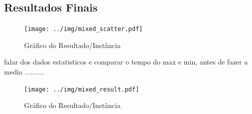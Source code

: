 \documentclass[a4paper, 12pt]{article}
\begin{document}
\subsection{Resultados Finais}


\begin{figure}[!htb]
    \centering
    \texttt{[image: ../img/mixed\_scatter.pdf]}
    \caption{Gráfico do Resultado/Instância}
    \label{fig:mixed_scatter}
\end{figure}

falar dos dados estatisticos e comparar o tempo do max e min, antes de fazer a media ..........
\begin{figure}[!htb]
    \centering
    \texttt{[image: ../img/mixed\_result.pdf]}
    \caption{Gráfico do Resultado/Instância}
    \label{fig:mixed_result}
\end{figure}
\end{document}
